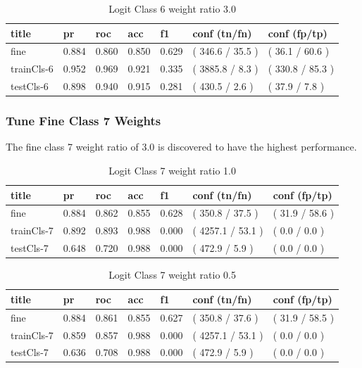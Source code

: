 \documentclass[ms]{nuthesis}
\begin{document}
\FloatBarrier
\begin{table}[H]
\centering
\caption{Logit Class 6 weight ratio 3.0}
\label{tab:LogRegCls6-Wt3}
\begin{tabular}{|l||l||l||l||l||l||l|}\toprule
title & pr & roc & acc & f1 & conf (tn/fn) & conf (fp/tp) \\ \midrule
fine & 0.884 & 0.860 & 0.850 & 0.629 & ( 346.6 / 35.5 ) & ( 36.1 / 60.6 ) \\
trainCls-6 & 0.952 & 0.969 & 0.921 & 0.335 & ( 3885.8 / 8.3 ) & ( 330.8 / 85.3 ) \\
testCls-6 & 0.898 & 0.940 & 0.915 & 0.281 & ( 430.5 / 2.6 ) & ( 37.9 / 7.8 ) \\ \bottomrule
\end{tabular}
\end{table}
\FloatBarrier


\subsubsection{Tune Fine Class 7 Weights}
\par The fine class 7 weight ratio of 3.0 is discovered to have the highest performance.
\FloatBarrier
\begin{table}[H]
\centering
\caption{Logit Class 7 weight ratio 1.0}
\label{tab:LogRegCls7-Wt1}
\begin{tabular}{|l||l||l||l||l||l||l|}\toprule
title & pr & roc & acc & f1 & conf (tn/fn) & conf (fp/tp) \\ \midrule
fine & 0.884 & 0.862 & 0.855 & 0.628 & ( 350.8 / 37.5 ) & ( 31.9 / 58.6 ) \\
trainCls-7 & 0.892 & 0.893 & 0.988 & 0.000 & ( 4257.1 / 53.1 ) & ( 0.0 / 0.0 ) \\
testCls-7 & 0.648 & 0.720 & 0.988 & 0.000 & ( 472.9 / 5.9 ) & ( 0.0 / 0.0 ) \\ \bottomrule
\end{tabular}
\end{table}
\FloatBarrier

\FloatBarrier
\begin{table}[H]
\centering
\caption{Logit Class 7 weight ratio 0.5}
\label{tab:LogRegCls7-Wtp5}
\begin{tabular}{|l||l||l||l||l||l||l|}\toprule
title & pr & roc & acc & f1 & conf (tn/fn) & conf (fp/tp) \\ \midrule
fine & 0.884 & 0.861 & 0.855 & 0.627 & ( 350.8 / 37.6 ) & ( 31.9 / 58.5 ) \\
trainCls-7 & 0.859 & 0.857 & 0.988 & 0.000 & ( 4257.1 / 53.1 ) & ( 0.0 / 0.0 ) \\
testCls-7 & 0.636 & 0.708 & 0.988 & 0.000 & ( 472.9 / 5.9 ) & ( 0.0 / 0.0 ) \\ \bottomrule
\end{tabular}
\end{table}
\FloatBarrier
\end{document}
